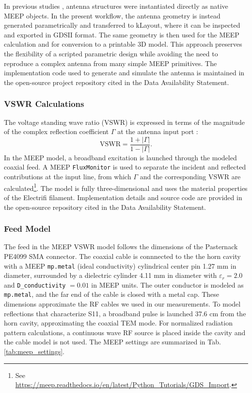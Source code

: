 \documentclass[electronics,article,submit,pdftex,moreauthors]{Definitions/mdpi}
\begin{document}
In previous studies \cite{hanson2021broadband-cab}, antenna structures were instantiated directly as native MEEP objects.  In the present workflow, the antenna geometry is instead generated parametrically and transferred to kLayout, where it can be inspected and exported in GDSII format.  The same geometry is then used for the MEEP calculation and for conversion to a printable 3D model.  This approach preserves the flexibility of a scripted parametric design while avoiding the need to reproduce a complex antenna from many simple MEEP primitives.  The implementation code used to generate and simulate the antenna is maintained in the open-source project repository cited in the Data Availability Statement.

\subsubsection{VSWR Calculations}

The voltage standing wave ratio (VSWR) is expressed in terms of the magnitude of the complex reflection coefficient $\Gamma$ at the antenna input port \cite{pozar}:
\begin{equation}
\mathrm{VSWR}=\frac{1+|\Gamma|}{1-|\Gamma|}.
\label{eq:3}
\end{equation}
In the MEEP model, a broadband excitation is launched through the modeled coaxial feed.  A MEEP \texttt{FluxMonitor} is used to separate the incident and reflected contributions at the input line, from which $\Gamma$ and the corresponding VSWR are calculated\footnote{See \url{https://meep.readthedocs.io/en/latest/Python_Tutorials/GDS_Import}.}.  The model is fully three-dimensional and uses the material properties of the Electrifi filament.  Implementation details and source code are provided in the open-source repository cited in the Data Availability Statement.

\subsubsection{Feed Model}

The feed in the MEEP VSWR model follows the dimensions of the Pasternack PE4099 SMA connector.  The coaxial cable is connnected to the the horn cavity with a MEEP \texttt{mp.metal} (ideal conductivity) cylindrical center pin 1.27 mm in diameter, surrounded by a dielectric cylinder 4.11 mm in diameter with $\varepsilon_r = 2.0$ and \texttt{D\_conductivity} $= 0.01$ in MEEP units.  The outer conductor is modeled as \texttt{mp.metal}, and the far end of the cable is closed with a metal cap.  These dimensions approximate the RF cables we used in our measurements.  To model reflections that characterize S11, a broadband pulse is launched 37.6 cm from the horn cavity, approximating the coaxial TEM mode.  For normalized radiation pattern calculations, a continuous wave RF source is placed inside the cavity and the cable model is not used.  The MEEP settings are summarized in Tab. \ref{tab:meep_settings}.
\end{document}
